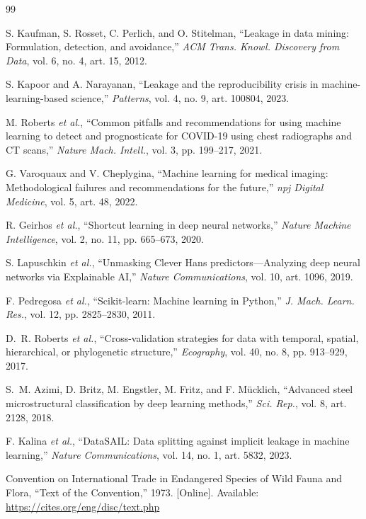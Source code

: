 \begin{thebibliography}{99}

S. Kaufman, S. Rosset, C. Perlich, and O. Stitelman, ``Leakage in data mining: Formulation, detection, and avoidance,'' \emph{ACM Trans. Knowl. Discovery from Data}, vol. 6, no. 4, art. 15, 2012.

S. Kapoor and A. Narayanan, ``Leakage and the reproducibility crisis in machine-learning-based science,'' \emph{Patterns}, vol. 4, no. 9, art. 100804, 2023.

M. Roberts \emph{et al.}, ``Common pitfalls and recommendations for using machine learning to detect and prognosticate for COVID-19 using chest radiographs and CT scans,'' \emph{Nature Mach. Intell.}, vol. 3, pp. 199--217, 2021.

G. Varoquaux and V. Cheplygina, ``Machine learning for medical imaging: Methodological failures and recommendations for the future,'' \emph{npj Digital Medicine}, vol. 5, art. 48, 2022.

R. Geirhos \emph{et al.}, ``Shortcut learning in deep neural networks,'' \emph{Nature Machine Intelligence}, vol. 2, no. 11, pp. 665--673, 2020.

S. Lapuschkin \emph{et al.}, ``Unmasking Clever Hans predictors---Analyzing deep neural networks via Explainable AI,'' \emph{Nature Communications}, vol. 10, art. 1096, 2019.

F. Pedregosa \emph{et al.}, ``Scikit-learn: Machine learning in Python,'' \emph{J. Mach. Learn. Res.}, vol. 12, pp. 2825--2830, 2011.

D.~R. Roberts \emph{et al.}, ``Cross-validation strategies for data with temporal, spatial, hierarchical, or phylogenetic structure,'' \emph{Ecography}, vol. 40, no. 8, pp. 913--929, 2017.

S.~M. Azimi, D. Britz, M. Engstler, M. Fritz, and F. M\"ucklich, ``Advanced steel microstructural classification by deep learning methods,'' \emph{Sci. Rep.}, vol. 8, art. 2128, 2018.

F. Kalina \emph{et al.}, ``DataSAIL: Data splitting against implicit leakage in machine learning,'' \emph{Nature Communications}, vol. 14, no. 1, art. 5832, 2023.

Convention on International Trade in Endangered Species of Wild Fauna and Flora, ``Text of the Convention,'' 1973. [Online]. Available: \url{https://cites.org/eng/disc/text.php}


\end{thebibliography}
